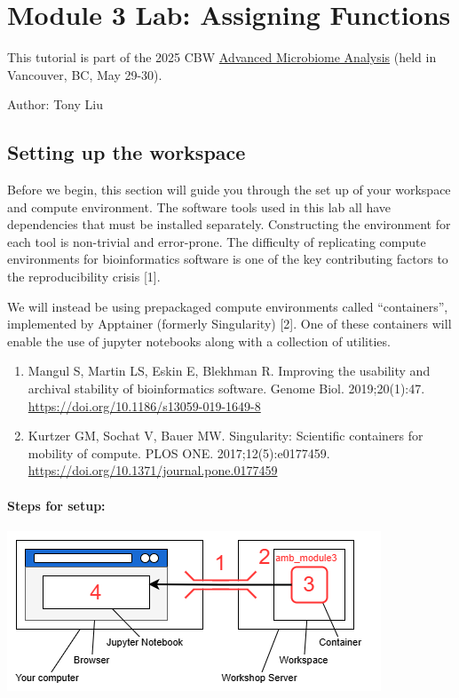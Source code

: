 \documentclass[
]{book}
\providecommand{\tightlist}{%
  \setlength{\itemsep}{0pt}\setlength{\parskip}{0pt}}
\begin{document}
\chapter{Module 3 Lab: Assigning Functions}\label{module-3-lab-assigning-functions}

This tutorial is part of the 2025 CBW \href{https://bioinformaticsdotca.github.io/AMB_2025/}{Advanced Microbiome Analysis} (held in Vancouver, BC, May 29-30).

Author: Tony Liu

\section{Setting up the workspace}\label{setting-up-the-workspace}

Before we begin, this section will guide you through the set up of your workspace and compute environment.
The software tools used in this lab all have dependencies that must be installed separately.
Constructing the environment for each tool is non-trivial and error-prone.
The difficulty of replicating compute environments for bioinformatics software is one of the key contributing factors
to the reproducibility crisis {[}1{]}.

We will instead be using prepackaged compute environments called ``containers'', implemented by Apptainer (formerly Singularity) {[}2{]}.
One of these containers will enable the use of jupyter notebooks along with a collection of utilities.

\begin{enumerate}
\def\labelenumi{\arabic{enumi}.}
\tightlist
\item
  Mangul S, Martin LS, Eskin E, Blekhman R. Improving the usability and archival stability of bioinformatics software. Genome Biol. 2019;20(1):47. \url{https://doi.org/10.1186/s13059-019-1649-8}
\item
  Kurtzer GM, Sochat V, Bauer MW. Singularity: Scientific containers for mobility of compute. PLOS ONE. 2017;12(5):e0177459. \url{https://doi.org/10.1371/journal.pone.0177459}
\end{enumerate}

\subsubsection{Steps for setup:}\label{steps-for-setup}

\includegraphics{img/lab3/compute_env.png}
\end{document}
